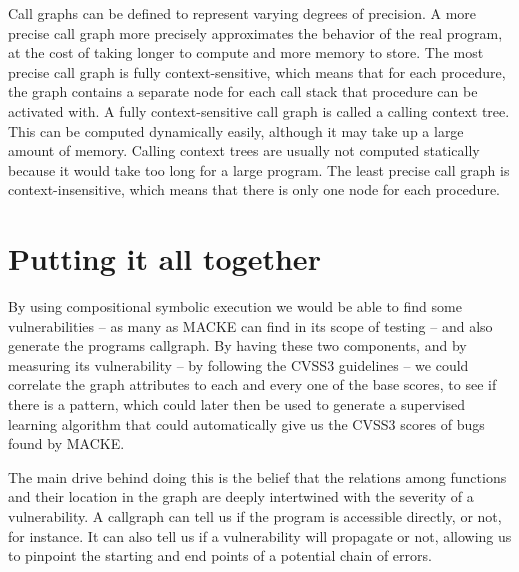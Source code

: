 Call graphs can be defined to represent varying degrees of precision. A more precise call graph more precisely approximates the behavior of the real program, at the cost of taking longer to compute and more memory to store. The most precise call graph is fully context-sensitive, which means that for each procedure, the graph contains a separate node for each call stack that procedure can be activated with. A fully context-sensitive call graph is called a calling context tree. This can be computed dynamically easily, although it may take up a large amount of memory. Calling context trees are usually not computed statically because it would take too long for a large program. The least precise call graph is context-insensitive, which means that there is only one node for each procedure.


\section{Putting it all together}

By using compositional symbolic execution we would be able to find some vulnerabilities -- as many as MACKE can find in its scope of testing -- and also generate the programs callgraph. By having these two components, and by measuring its vulnerability -- by following the CVSS3 guidelines -- we could correlate the graph attributes to each and every one of the base scores, to see if there is a pattern, which could later then be used to generate a supervised learning algorithm that could automatically give us the CVSS3 scores of bugs found by MACKE. 

The main drive behind doing this is the belief that the relations among functions and their location in the graph are deeply intertwined with the severity of a vulnerability. A callgraph can tell us if the program is accessible directly, or not, for instance. It can also tell us if a vulnerability will propagate or not, allowing us to pinpoint the starting and end points of a potential chain of errors.